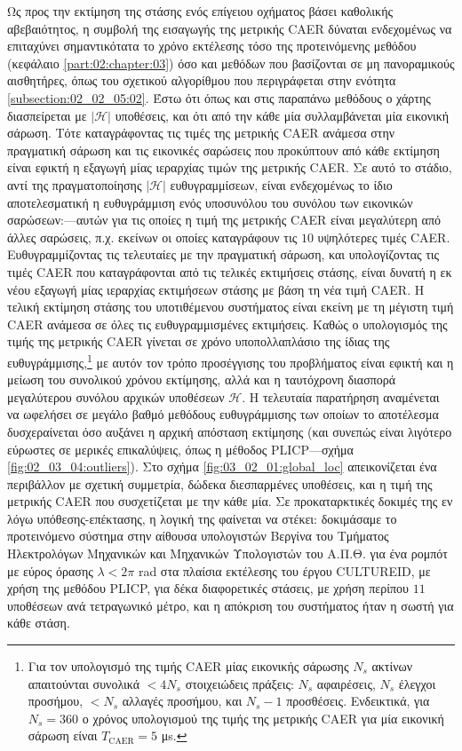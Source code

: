 Ως προς την εκτίμηση της στάσης ενός επίγειου οχήματος βάσει καθολικής
αβεβαιότητος, η συμβολή της εισαγωγής της μετρικής CAER δύναται ενδεχομένως να
επιταχύνει σημαντικότατα το χρόνο εκτέλεσης τόσο της προτεινόμενης μεθόδου
(κεφάλαιο \ref{part:02:chapter:03}) όσο και μεθόδων που βασίζονται σε μη
πανοραμικούς αισθητήρες, όπως του σχετικού αλγορίθμου που περιγράφεται στην
ενότητα \ref{subsection:02_02_05:02}. Έστω ότι όπως και στις παραπάνω μεθόδους
ο χάρτης διασπείρεται με $|\mathcal{H}|$ υποθέσεις, και ότι από την κάθε μία
συλλαμβάνεται μία εικονική σάρωση. Τότε καταγράφοντας τις τιμές της μετρικής
CAER ανάμεσα στην πραγματική σάρωση και τις εικονικές σαρώσεις που προκύπτουν
από κάθε εκτίμηση είναι εφικτή η εξαγωγή μίας ιεραρχίας τιμών της μετρικής
CAER. Σε αυτό το στάδιο, αντί της πραγματοποίησης $|\mathcal{H}|$
ευθυγραμμίσεων, είναι ενδεχομένως το ίδιο αποτελεσματική η ευθυγράμμιση ενός
υποσυνόλου του συνόλου των εικονικών σαρώσεων:---αυτών για τις οποίες η τιμή
της μετρικής CAER είναι μεγαλύτερη από άλλες σαρώσεις, π.χ. εκείνων οι οποίες
καταγράφουν τις $10$ υψηλότερες τιμές CAER.  Ευθυγραμμίζοντας τις τελευταίες με
την πραγματική σάρωση, και υπολογίζοντας τις τιμές CAER που καταγράφονται από
τις τελικές εκτιμήσεις στάσης, είναι δυνατή η εκ νέου εξαγωγή μίας ιεραρχίας
εκτιμήσεων στάσης με βάση τη νέα τιμή CAER. Η τελική εκτίμηση στάσης του
υποτιθέμενου συστήματος είναι εκείνη με τη μέγιστη τιμή CAER ανάμεσα σε όλες
τις ευθυγραμμισμένες εκτιμήσεις. Καθώς ο υπολογισμός της τιμής της μετρικής
CAER γίνεται σε χρόνο υποπολλαπλάσιο της ίδιας της ευθυγράμμισης,\footnote{Για
τον υπολογισμό της τιμής CAER μίας εικονικής σάρωσης $N_s$ ακτίνων απαιτούνται
συνολικά $<4N_s$ στοιχειώδεις πράξεις: $N_s$ αφαιρέσεις, $N_s$ έλεγχοι
προσήμου, $< N_s$ αλλαγές προσήμου, και $N_s-1$ προσθέσεις. Ενδεικτικά, για
$N_s=360$ ο χρόνος υπολογισμού της τιμής της μετρικής CAER για μία εικονική
σάρωση είναι $T_{\text{CAER}} = 5$ μs.} με αυτόν τον τρόπο προσέγγισης του
προβλήματος είναι εφικτή και η μείωση του συνολικού χρόνου εκτίμησης, αλλά και
η ταυτόχρονη διασπορά μεγαλύτερου συνόλου αρχικών υποθέσεων $\mathcal{H}$. Η
τελευταία παρατήρηση αναμένεται να ωφελήσει σε μεγάλο βαθμό μεθόδους
ευθυγράμμισης των οποίων το αποτέλεσμα δυσχεραίνεται όσο αυξάνει η αρχική
απόσταση εκτίμησης (και συνεπώς είναι λιγότερο εύρωστες σε μερικές επικαλύψεις,
όπως η μέθοδος PLICP---σχήμα \ref{fig:02_03_04:outliers}).  Στο σχήμα
\ref{fig:03_02_01:global_loc} απεικονίζεται ένα περιβάλλον με σχετική
συμμετρία, δώδεκα διεσπαρμένες υποθέσεις, και η τιμή της μετρικής CAER που
συσχετίζεται με την κάθε μία. Σε προκαταρκτικές δοκιμές της εν λόγω
υπόθεσης-επέκτασης, η λογική της φαίνεται να στέκει: δοκιμάσαμε το προτεινόμενο
σύστημα στην αίθουσα υπολογιστών Βεργίνα του Τμήματος Ηλεκτρολόγων Μηχανικών
και Μηχανικών Υπολογιστών του Α.Π.Θ. για ένα ρομπότ με εύρος όρασης
$\lambda < 2\pi$ rad στα πλαίσια εκτέλεσης του έργου CULTUREID, με χρήση της
μεθόδου PLICP, για δέκα διαφορετικές στάσεις, με χρήση περίπου $11$ υποθέσεων
ανά τετραγωνικό μέτρο, και η απόκριση του συστήματος ήταν η σωστή για κάθε
στάση.

